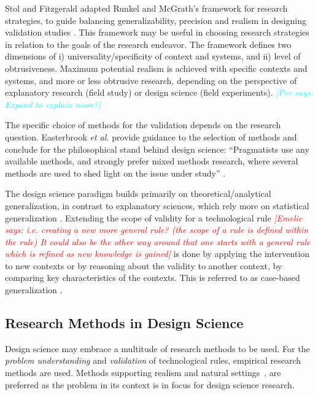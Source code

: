 \documentclass[graybox]{svmult}
\newcommand{\emelie}[1]{\textcolor{red}{{\it [Emelie says: #1]}}}
\newcommand{\per}[1]{\textcolor{cyan}{{\it [Per says: #1]}}}
\newcommand{\emelie}[1]{}
\newcommand{\per}[1]{}
\begin{document}
Stol and Fitzgerald adapted Runkel and McGrath's framework for research strategies, to guide balancing generalizability, precision and realism in designing validation studies \cite{StolABC18}. This framework may be useful in choosing research strategies in relation to the goals of the research endeavor. The framework defines two dimensions of i) universality/specificity of context and systems, and ii) level of obtrusiveness. Maximum potential realism is achieved with specific contexts and systems, and more or less obtrusive research, depending on the perspective of explanatory research (field study) or design science (field experiments). \per{Expand to explain more?} 

The specific choice of methods for the validation depends on the research question. Easterbrook \emph{et al.} provide guidance to the selection of methods and conclude for the philosophical stand behind design science: ``Pragmatists use any available methods, and strongly prefer mixed methods research, where several methods are used to shed light on the issue under study'' \cite{easterbrook_selecting_2008}.

The design science paradigm builds primarily on theoretical/analytical generalization, in contrast to explanatory sciences, which rely more on statistical generalization \cite[p. 30]{Runeson12Case}. Extending the scope of validity for a technological rule \emelie{i.e. creating a new more general rule? (the scope of a rule is defined within the rule) It could also be the other way around that one starts with a general rule which is refined as new knowledge is gained} is done by applying the intervention to new contexts or by reasoning about the validity to another context, by comparing key characteristics of the contexts. This is referred to as case-based generalization \cite{Wieringa2015}. 


\subsection{Research Methods in Design Science} 


Design science %
may embrace a multitude of research methods to be used. For the \emph{problem understanding} and \emph{validation} of technological rules, empirical research methods are used. Methods supporting realism and natural settings~\cite{StolABC18}, are preferred as the problem in its context is in focus for design science research. 
\end{document}
